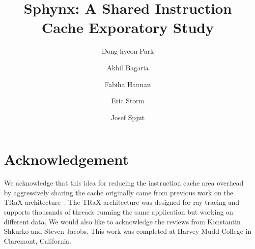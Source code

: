 \documentclass[pageno]{jpaper}
\begin{document}
\title{Sphynx: A Shared Instruction Cache Exporatory Study}

\author{\vspace{.08in} Dong-hyeon Park \and Akhil Bagaria \and Fabiha Hannan \and
  Eric Storm \and Josef Spjut}

\date{}
\maketitle

\thispagestyle{empty}

\begin{abstract}

\end{abstract}







\section*{Acknowledgement}
We acknowledge that this idea for reducing the instruction cache area
overhead by aggressively sharing the cache originally came from
previous work on the TRaX
architecture~\cite{spjut08,spjut09,kopta10,spjut12,kopta13,kopta14}.
The TRaX architecture was designed for ray tracing and supports
thousands of threads running the same application but working on
different data.
We would also like to acknowledge the reviews from Konstantin Shkurko and Steven Jacobs.
This work was completed at Harvey Mudd College in Claremont, California.



\end{document}
